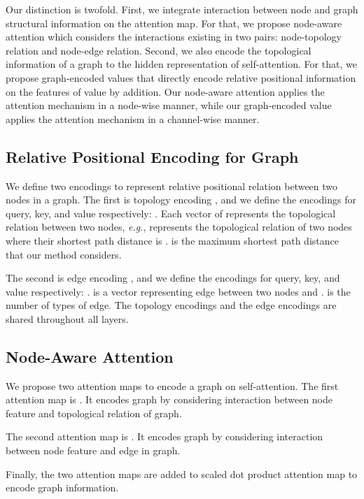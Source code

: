 \documentclass[letterpaper]{article} \usepackage{aaai23}  \usepackage{times}  \usepackage{helvet}  \usepackage{courier}  \usepackage[hyphens]{url}  \usepackage{graphicx} \urlstyle{rm} \def\UrlFont{\rm}  \usepackage{natbib}  \usepackage{caption} \frenchspacing  \setlength{\pdfpagewidth}{8.5in} \setlength{\pdfpageheight}{11in} \usepackage{algorithm}
\newcommand{\eg}{\textit{e.g.}}
\begin{document}
Our distinction is twofold.
First, we integrate interaction between node and graph structural information on the attention map.
For that, we propose node-aware attention which considers the interactions existing in two pairs: node-topology relation and node-edge relation.
Second, we also encode the topological information of a graph to the hidden representation of self-attention. For that, we propose graph-encoded values that directly encode relative positional information on the features of value by addition. 
Our node-aware attention applies the attention mechanism in a node-wise manner, while our graph-encoded value applies the attention mechanism in a channel-wise manner.



\subsection{Relative Positional Encoding for Graph}


We define two encodings to represent relative positional relation between two nodes in a graph.
The first is topology encoding , and we define the encodings for query, key, and value respectively: .
Each vector of  represents the topological relation between two nodes, \eg,  represents the topological relation of two nodes where their shortest path distance is . 
 is the maximum shortest path distance that our method considers.

The second is edge encoding , and we define the encodings for query, key, and value respectively: .  is a vector representing edge between two nodes  and .
 is the number of types of edge.
The topology encodings and the edge encodings are shared throughout all layers.


\subsection{Node-Aware Attention}
\label{sec:context_aware}

We propose two attention maps to encode a graph on self-attention.
The first attention map is .
It encodes graph by considering interaction between node feature and topological relation of graph.



The second attention map is .
It encodes graph by considering interaction between node feature and edge in graph.


Finally, the two attention maps are added to scaled dot product attention map to encode graph information.
\end{document}
